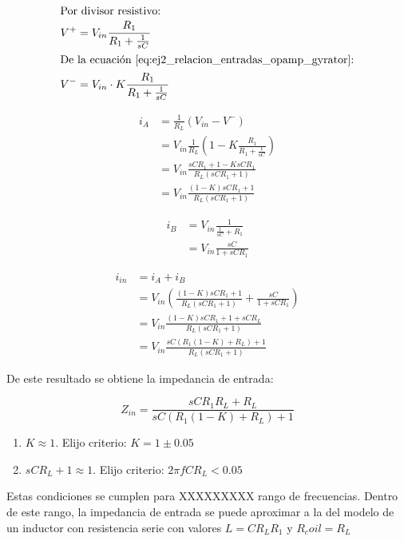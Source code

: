 \begin{align}
	\intertext{Por divisor resistivo:}
	V^+&=V_{in}\frac{R_1}{R_1+\frac{1}{sC}} \\
	\intertext{De la ecuaci\'on \ref{eq:ej2_relacion_entradas_opamp_gyrator}:}
	V^-&=V_{in}\cdot K \frac{R_1}{R_1+\frac{1}{sC}}
\end{align} 

\begin{align}
i_A &= \frac{1}{R_L}\left(V_{in} - V^-\right)\\
 &= V_{in} \frac{1}{R_L}\left( 1-K\frac{R_1}{R_1+\frac{1}{sC}} \right)\\
 &= V_{in} \frac{sCR_1+1-KsCR_1}{R_L\left( sCR_1+1 \right)} \\
 &= V_{in} \frac{(1-K)sCR_1+1}{R_L\left( sCR_1+1 \right)}
\end{align}


\begin{align}
i_B &= V_{in} \frac{1}{\frac{1}{sC} + R_1}\\
	&= V_{in} \frac{sC}{1+sCR_1}
\end{align}

\begin{align}
i_{in} &= i_A + i_B \\
 &= V_{in} \left( \frac{(1-K)sCR_1+1}{R_L\left( sCR_1+1 \right)} +   \frac{sC}{1+sCR_1}   \right) \\ 
 &= V_{in}  \frac{(1-K)sCR_1+1 + sCR_L}{R_L\left( sCR_1+1 \right)} \\
 &= V_{in}  \frac{sC(R_1(1-K)+R_L) + 1}{R_L(sCR_1+1)} 
\end{align}

De este resultado se obtiene la impedancia de entrada:

\begin{equation}
Z_{in}= \frac{ sCR_1R_L+R_L}{sC(R_1(1-K)+R_L) + 1}
\end{equation}

\begin{enumerate}
	\item $K \approx 1$. Elijo criterio: $K=1\pm 0.05$
	\item $sCR_L +1 \approx 1$. Elijo criterio: $2\pi fCR_L <0.05$
\end{enumerate}

Estas condiciones se cumplen para XXXXXXXXX rango de frecuencias. Dentro de este rango, la impedancia de entrada se puede aproximar a la del modelo de un inductor con resistencia serie con valores $L=CR_LR_1$ y $R_coil=R_L$

